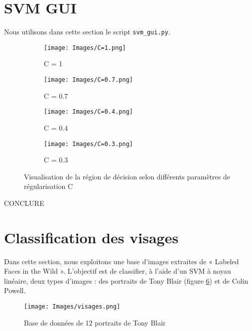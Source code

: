 \documentclass[a4paper,12pt]{article}
\begin{document}
\section{SVM GUI}

Nous utilisons dans cette section le script \texttt{svm\_gui.py}.

\begin{figure}[H]
    \centering
    \begin{subfigure}[b]{0.45\textwidth}
        \centering
        \texttt{[image: Images/C=1.png]}
        \caption{C = 1}
        \label{}
    \end{subfigure}
    \hfill
    \begin{subfigure}[b]{0.45\textwidth}
        \centering
        \texttt{[image: Images/C=0.7.png]}
        \caption{C = 0.7}
        \label{}
    \end{subfigure}

    \begin{subfigure}[b]{0.45\textwidth}
        \centering
        \texttt{[image: Images/C=0.4.png]}
        \caption{C = 0.4}
        \label{}
    \end{subfigure}
    \hfill
    \begin{subfigure}[b]{0.45\textwidth}
        \centering
        \texttt{[image: Images/C=0.3.png]}
        \caption{C = 0.3}
        \label{}
    \end{subfigure}

    \caption{Visualisation de la région de décision selon différents paramètres de régularisation C}
    \label{fig:carre}
\end{figure}

CONCLURE \\

\newpage

\section{Classification des visages}

Dans cette section, nous exploitons une base d'images extraites de « Labeled Faces in the Wild ».
L'objectif est de classifier, à l'aide d'un SVM à noyau linéaire, deux types d'images : des portraits de Tony Blair (figure \ref{fig : visages}) et de Colin Powell. 


\begin{figure}[H]
    \centering
    \texttt{[image: Images/visages.png]}
    \caption{Base de données de 12 portraits de Tony Blair}
    \label{fig : visages}
\end{figure}
\end{document}

